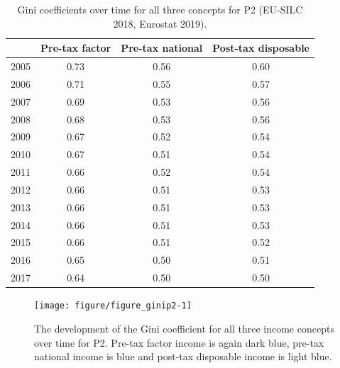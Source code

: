 \documentclass[a4paper]{article}\usepackage[]{graphicx}\usepackage[]{color}
\newenvironment{knitrout}{}{} %
\begin{document}
\begin{table}[ht]
\centering
\begin{tabular}{lccc}
  \toprule
 & Pre-tax factor & Pre-tax national & Post-tax disposable \\ 
  \midrule
2005 & 0.73 & 0.56 & 0.60 \\ 
  2006 & 0.71 & 0.55 & 0.57 \\ 
  2007 & 0.69 & 0.53 & 0.56 \\ 
  2008 & 0.68 & 0.53 & 0.56 \\ 
  2009 & 0.67 & 0.52 & 0.54 \\ 
  2010 & 0.67 & 0.51 & 0.54 \\ 
  2011 & 0.66 & 0.52 & 0.54 \\ 
  2012 & 0.66 & 0.51 & 0.53 \\ 
  2013 & 0.66 & 0.51 & 0.53 \\ 
  2014 & 0.66 & 0.51 & 0.53 \\ 
  2015 & 0.66 & 0.51 & 0.52 \\ 
  2016 & 0.65 & 0.50 & 0.51 \\ 
  2017 & 0.64 & 0.50 & 0.50 \\ 
   \bottomrule
\end{tabular}
\caption{Gini coefficients over time for all three concepts for P2 (EU-SILC 2018, Eurostat 2019).} 
\label{gini_p2}
\end{table}


\begin{knitrout}
\color{fgcolor}\begin{figure}[H]

{\centering \texttt{[image: figure/figure\_ginip2-1]} 

}

\caption[The development of the Gini coefficient for all three income concepts over time for P2]{The development of the Gini coefficient for all three income concepts over time for P2. Pre-tax factor income is again dark blue, pre-tax national income is blue and post-tax disposable income is light blue.}\label{fig:figure_ginip2}
\end{figure}


\end{knitrout}
\end{document}
